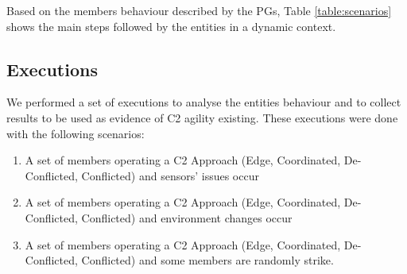 

Based on the members behaviour described by the PGs, Table \ref{table:scenarios} shows the main steps followed by the entities in a dynamic context.



\subsection{Executions}

We performed a set of executions to analyse the entities behaviour and to collect results to be used as evidence of C2 agility existing. These executions were done with the following scenarios:

\begin{enumerate}
    \item A set of members operating a C2 Approach (Edge, Coordinated, De-Conflicted, Conflicted) and sensors' issues occur
    \item A set of members operating a C2 Approach (Edge, Coordinated, De-Conflicted, Conflicted) and environment changes occur
    \item A set of members operating a C2 Approach (Edge, Coordinated, De-Conflicted, Conflicted) and some members are randomly strike.
    
\end{enumerate}


